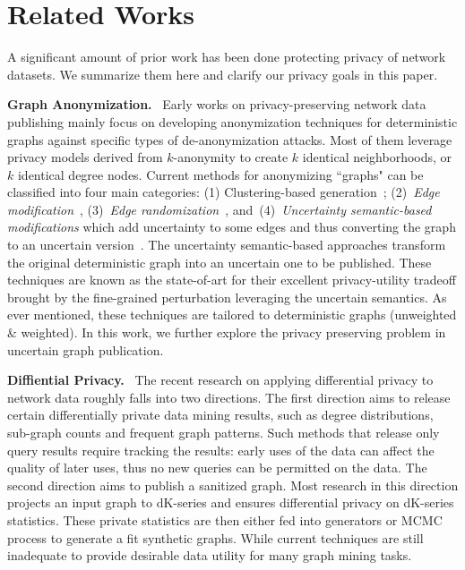 \section{Related Works}
A significant amount of prior work has been done protecting privacy of network datasets.
We summarize them here and clarify our privacy goals in this paper. 

\textbf{Graph Anonymization.}~ Early works on privacy-preserving network data publishing mainly focus on developing anonymization techniques for deterministic graphs against specific types of de-anonymization attacks. Most of them leverage privacy models derived from $k$-anonymity to create $k$ identical neighborhoods, or $k$ identical degree nodes. Current methods for anonymizing ``graphs" can be classified into four main categories: (1) Clustering-based generation~\cite{Hay_Anonymizing_2007,Bhagat_Class_2009,hay2010resisting}; (2)~{\em Edge modification}~\cite{Liu_Towards_2008, Zhou_Preserving_2008, Wang2011, Wu_k_2010, Skarkala_Privacy_2012}, 
(3)~{\em Edge randomization}~\cite{Liu_Privacy_2009,Ying_Randomizing_2008, Ninggal_Utility_2015},
and~(4)~{\em Uncertainty semantic-based modifications} which add uncertainty to some edges and thus converting the graph to an uncertain version~\cite{Boldi_Injecting_2012, Nguyen_Anonymizing_2015}. 
The uncertainty semantic-based approaches transform the original deterministic graph into an uncertain one to be published. These techniques are known as the state-of-art for their excellent privacy-utility tradeoff brought by the fine-grained perturbation leveraging the uncertain semantics. As ever mentioned, these techniques are tailored to deterministic graphs (unweighted \& weighted). In this work, we further explore the privacy preserving problem in uncertain graph publication. 


\textbf{Diffiential Privacy.}~ The recent research on applying differential privacy to network data roughly falls into two directions. The first direction aims to release certain differentially private data mining results, such as degree distributions, sub-graph counts and frequent graph patterns. Such methods that release only query results require tracking the results: early uses of the data can affect the quality of later uses, thus no new queries can be permitted on the data.  
The second direction aims to publish a sanitized graph. Most research in this direction projects an input graph to dK-series and ensures differential privacy on dK-series statistics. These private statistics are then either fed into generators or MCMC process to generate a fit synthetic graphs. While current techniques are still inadequate to provide desirable data utility for many graph mining tasks. 



